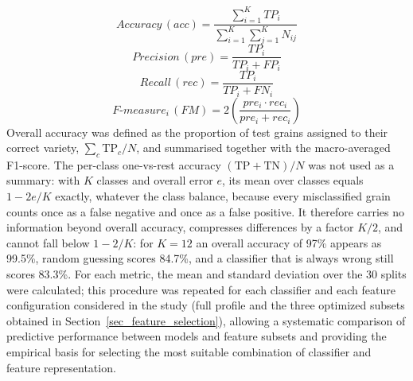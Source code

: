 \documentclass[final,5p,times,twocolumn]{elsarticle}
\newcommand{\added}[1]{{\color{blue}#1}}
\begin{document}
\begin{itemize}
    \begin{equation}
        Accuracy \, (acc) = \frac{\sum_{i=1}^{K}TP_{i}}{\sum_{i=1}^{K} \sum_{j=1}^{K}N_{ij}}
        \label{eq_acc}
    \end{equation}
    \begin{equation}
        Precision \, (pre) = \frac{TP_{i}}{TP_{i} + FP_{i}}
        \label{eq_pre}
    \end{equation}
    \begin{equation}
        Recall \, (rec) =  \frac{TP_{i}}{TP_{i} + FN_{i}}
        \label{eq_rec}
    \end{equation}
    \begin{equation}
        F\text{-}measure_{i} \, (FM) =  2\left(\frac{pre_{i}\cdot rec_{i}}{pre_{i}+rec_{i}}\right)
        \label{eq_fm}
    \end{equation}
\added{Overall accuracy was defined as the proportion of test grains assigned to their correct variety, $\sum_c \mathrm{TP}_c / N$, and summarised together with the macro-averaged F1-score. The per-class one-vs-rest accuracy $(\mathrm{TP}+\mathrm{TN})/N$ was not used as a summary: with $K$ classes and overall error $e$, its mean over classes equals $1-2e/K$ exactly, whatever the class balance, because every misclassified grain counts once as a false negative and once as a false positive. It therefore carries no information beyond overall accuracy, compresses differences by a factor $K/2$, and cannot fall below $1-2/K$: for $K=12$ an overall accuracy of 97\% appears as 99.5\%, random guessing scores 84.7\%, and a classifier that is always wrong still scores 83.3\%.}
    For each metric, the mean and standard deviation over the \added{30 splits} were calculated; this procedure was repeated for each classifier and each feature configuration considered in the study (full profile and the three optimized subsets obtained in Section~\added{\ref{sec_feature_selection}}), allowing a systematic comparison of predictive performance between models and feature subsets and providing the empirical basis for selecting the most suitable combination of classifier and feature representation.

\end{itemize}
\end{document}
